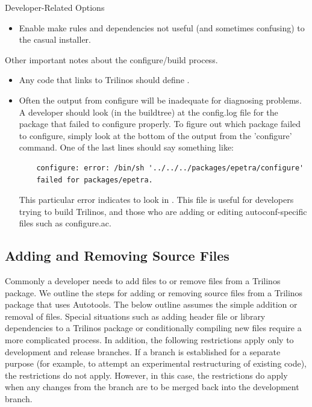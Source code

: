 \documentclass[12pt,relax]{TrilinosDevGuide}
\begin{document}
Developer-Related Options
\begin{itemize}
\item {}

Enable make rules and dependencies not useful (and sometimes confusing) to 
the casual installer.
\end{itemize}

Other important notes about the configure/build process.
\begin{itemize}
\item Any code that links to Trilinos should define .
\item Often the output from configure will be inadequate for diagnosing 
problems.  A developer should look (in the buildtree) at the config.log file 
for the package that failed to configure properly.  To figure out which 
package failed to configure, simply look at the bottom of the output from the 
'configure' command.  One of the last lines should say something like:

\begin{verbatim}
    configure: error: /bin/sh '../../../packages/epetra/configure' 
    failed for packages/epetra.
\end{verbatim}

This particular error indicates to look in .  This 
file is useful for developers trying to build Trilinos, and those who are 
adding or editing autoconf-specific files such as configure.ac.
\end{itemize}

\subsection{Adding and Removing Source Files}
Commonly a developer needs to add files to or remove files from a Trilinos 
package.  We outline the steps for adding or removing source files from a 
Trilinos package that uses Autotools.  The below outline assumes the simple 
addition or removal of files.  Special situations such as adding header file 
or library dependencies to a Trilinos package or conditionally compiling new 
files require a more complicated process.  In addition, the following 
restrictions apply only to development and release branches.  If a branch is 
established for a separate purpose (for example, to attempt an experimental 
restructuring of existing code), the restrictions do not apply.  However, in 
this case, the restrictions do apply when any changes from the branch are to 
be merged back into the development branch.
 
\end{document}
